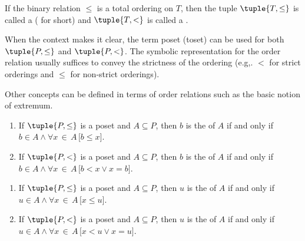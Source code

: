 \begin{dfn}[Toset]
    \label{dfn:toset}
    If the binary relation \( \leq \) is a total ordering on \( T \), then the tuple \( \tuple{T, \leq} \) is called a 
    ( for short) and \( \tuple{T, <} \) is called a .
\end{dfn}

\begin{rem}
    When the context makes it clear, the term poset (toset) can be used for both \( \tuple{P, \leq} \) and \( \tuple{P, <} \).
    The symbolic representation for the order relation usually suffices to convey the strictness of the ordering
    (e.g,. \( < \) for strict orderings and \( \leq \) for non-strict orderings).
\end{rem}

\vspace{0.3cm}
\noindent
Other concepts can be defined in terms of order relations such as the basic notion of extremum.

\begin{dfn}
    \label{dfn:least-element}
    \hfill
    \begin{enumerate}[topsep=2pt,label=\texttt{\textup{(\alph*)}},itemsep=5pt]
        \item If \( \tuple{P, \leq} \) is a poset and \( A \subseteq P \), then \( b \) is the  of \( A \)
              if and only if \( b \in A \land \forall x\,{\in}\,A \, \big[ b \leq x \big] \).
        \item If \( \tuple{P, <} \) is a poset and \( A \subseteq P \), then \( b \) is the  of \( A \)
              if and only if \( b \in A \land \forall x\,{\in}\,A \, \big[ b < x \lor x = b \big] \).
    \end{enumerate}
\end{dfn}

\begin{dfn}
    \label{dfn:greatest-element}
    \hfill
    \begin{enumerate}[topsep=2pt,label=\texttt{\textup{(\alph*)}},itemsep=5pt]
        \item If \( \tuple{P, \leq} \) is a poset and \( A \subseteq P \), then \( u \) is the  of \( A \)
              if and only if \( u \in A \land \forall x\,{\in}\,A \, \big[ x \leq u \big] \).
        \item If \( \tuple{P, <} \) is a poset and \( A \subseteq P \), then \( u \) is the  of \( A \)
              if and only if \( u \in A \land \forall x\,{\in}\,A \, \big[ x < u \lor x = u \big] \).
    \end{enumerate}
\end{dfn}

